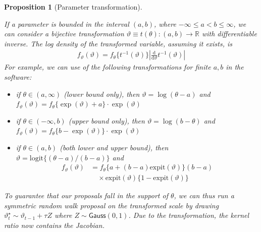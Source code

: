 \documentclass[
  11pt,
  letterpaper,
]{scrbook}
\providecommand{\tightlist}{%
  \setlength{\itemsep}{0pt}\setlength{\parskip}{0pt}}\usepackage{longtable,booktabs,array}
\theoremstyle{definition}
\theoremstyle{definition}
\theoremstyle{definition}
\theoremstyle{plain}
\newtheorem{proposition}{Proposition}[chapter]
\theoremstyle{plain}
\theoremstyle{remark}
\begin{document}
\begin{proposition}[Parameter
transformation]\protect\hypertarget{prp-parameter-transformation}{}\label{prp-parameter-transformation}

If a parameter is bounded in the interval \((a,b)\), where
\(-\infty \leq a < b \leq \infty\), we can consider a bijective
transformation \(\vartheta \equiv t(\theta): (a,b) \to \mathbb{R}\) with
differentiable inverse. The log density of the transformed variable,
assuming it exists, is \begin{align*}
f_\vartheta(\vartheta) = f_{\theta}\{t^{-1}(\vartheta)\} \left| \frac{\mathrm{d}}{\mathrm{d} \vartheta} t^{-1}(\vartheta)\right|
\end{align*} For example, we can use of the following transformations
for finite \(a, b\) in the software:

\begin{itemize}
\tightlist
\item
  if \(\theta \in (a, \infty)\) (lower bound only), then
  \(\vartheta = \log(\theta-a)\) and
  \(f_{\vartheta}(\vartheta)=f_{\theta}\{\exp(\vartheta) + a\}\cdot \exp(\vartheta)\)
\item
  if \(\theta \in (-\infty, b)\) (upper bound only), then
  \(\vartheta = \log(b-\theta)\) and
  \(f_{\vartheta}(\vartheta)=f_{\theta}\{b-\exp(\vartheta)\}\cdot \exp(\vartheta)\)
\item
  if \(\theta \in (a, b)\) (both lower and upper bound), then
  \(\vartheta = \mathrm{logit}\{(\theta-a)/(b-a)\}\) and \begin{align*}
  f_{\vartheta}(\vartheta)&=f_{\theta}\{a+(b-a) \mathrm{expit}(\vartheta)\} (b-a)\\&\quad \times \mathrm{expit}(\vartheta)\{1-\mathrm{expit}(\vartheta)\}
  \end{align*}
\end{itemize}

To guarantee that our proposals fall in the support of \(\theta\), we
can thus run a symmetric random walk proposal on the \emph{transformed
scale} by drawing \(\vartheta_{t}^{\star} \sim \vartheta_{t-1}+\tau Z\)
where \(Z\sim\mathsf{Gauss}(0, 1)\). Due to the transformation, the
kernel ratio now contains the Jacobian.

\end{proposition}
\end{document}
